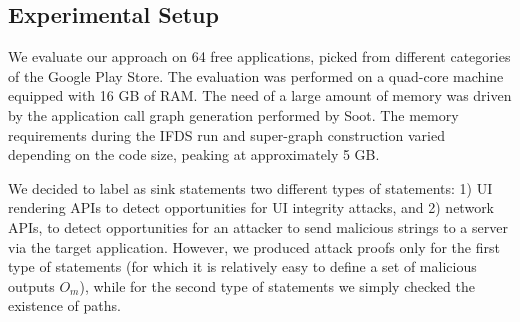 

\subsection{Experimental Setup}
We evaluate our approach on 64 free applications, picked from different categories of the Google Play Store. The evaluation was performed on a quad-core machine equipped with 16 GB of RAM. The need of a large amount of memory was driven by the application call graph generation performed by Soot. The memory requirements during the IFDS run and super-graph construction varied depending on the code size, peaking at approximately 5 GB.

We decided to label as sink statements two different types of statements: 1) UI rendering APIs to detect opportunities for UI integrity attacks, and 2) network APIs, to detect opportunities for an attacker to send malicious strings to a server via the target application. However, we produced attack proofs only for the first type of statements (for which it is relatively easy to define a set of malicious outputs $O_m$), while for the second type of statements we simply checked the existence of paths.

